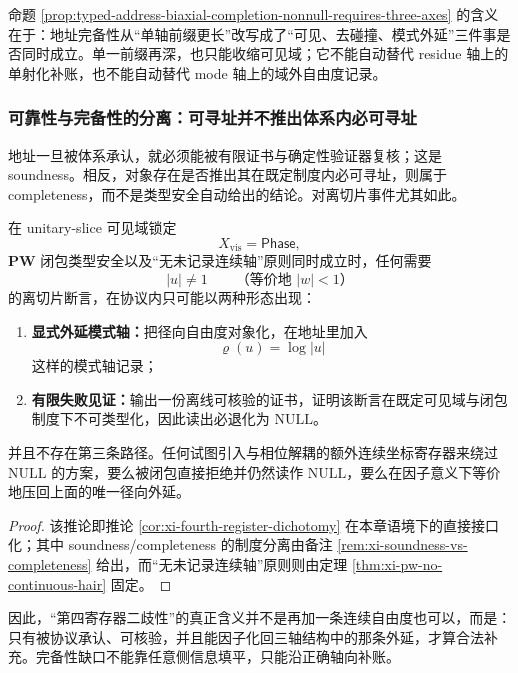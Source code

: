 命题 \ref{prop:typed-address-biaxial-completion-nonnull-requires-three-axes} 的含义在于：地址完备性从“单轴前缀更长”改写成了“可见、去碰撞、模式外延”三件事是否同时成立。单一前缀再深，也只能收缩可见域；它不能自动替代 residue 轴上的单射化补账，也不能自动替代 mode 轴上的域外自由度记录。

\subsubsection{可靠性与完备性的分离：可寻址并不推出体系内必可寻址}\label{subsubsec:typed-address-biaxial-completion-soundness-completeness}
地址一旦被体系承认，就必须能被有限证书与确定性验证器复核；这是 soundness。相反，对象存在是否推出其在既定制度内必可寻址，则属于 completeness，而不是类型安全自动给出的结论。对离切片事件尤其如此。

\begin{corollary}[离切片事件的二歧性接口]\label{cor:typed-address-biaxial-completion-offslice-dichotomy}
在 unitary-slice 可见域锁定
\[
X_{\mathrm{vis}}=\mathsf{Phase},
\]
\(\mathbf{PW}\) 闭包类型安全以及“无未记录连续轴”原则同时成立时，任何需要
\[
|u|\neq 1
\qquad
\text{（等价地 }|w|<1\text{）}
\]
的离切片断言，在协议内只可能以两种形态出现：
\begin{enumerate}
  \item \textbf{显式外延模式轴：}把径向自由度对象化，在地址里加入
  \[
  \varrho(u)=\log|u|
  \]
  这样的模式轴记录；
  \item \textbf{有限失败见证：}输出一份离线可核验的证书，证明该断言在既定可见域与闭包制度下不可类型化，因此读出必退化为 \(\mathrm{NULL}\)。
\end{enumerate}
并且不存在第三条路径。任何试图引入与相位解耦的额外连续坐标寄存器来绕过 \(\mathrm{NULL}\) 的方案，要么被闭包直接拒绝并仍然读作 \(\mathrm{NULL}\)，要么在因子意义下等价地压回上面的唯一径向外延。
\end{corollary}
\begin{proof}
该推论即推论 \ref{cor:xi-fourth-register-dichotomy} 在本章语境下的直接接口化；其中 soundness/completeness 的制度分离由备注 \ref{rem:xi-soundness-vs-completeness} 给出，而“无未记录连续轴”原则则由定理 \ref{thm:xi-pw-no-continuous-hair} 固定。
\end{proof}

因此，“第四寄存器二歧性”的真正含义并不是再加一条连续自由度也可以，而是：只有被协议承认、可核验，并且能因子化回三轴结构中的那条外延，才算合法补充。完备性缺口不能靠任意侧信息填平，只能沿正确轴向补账。

